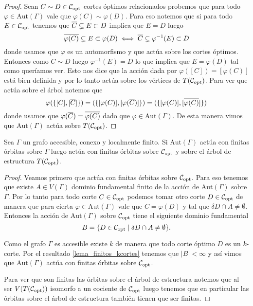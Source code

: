 \documentclass[tesis.tex]{subfiles}
\newcommand{\aut}{\text{Aut}}
\begin{document}
\begin{proof}
	Sean $C \sim D \in {\cal C}_{\text{opt}}$ cortes óptimos relacionados probemos que para todo $\varphi \in \aut(\Gamma)$ vale que $\varphi(C) \sim \varphi(D)$.
	Para eso notemos que si para todo $E \in {\cal C}_{\text{opt}}$ tenemos que 
	$\overline C \subsetneq E \subset D$ implica que $E = D$ luego
	\[
	\overline {\varphi(C)} \subsetneq E \subset \varphi(D) \iff \overline C \subsetneq \varphi^{-1}(E) \subset D
	\]  
	donde usamos que $\varphi$ es un automorfismo y que actúa sobre los cortes óptimos.
	Entonces como $C \sim D$ luego $\varphi^{-1}(E) = D$ lo que implica que $E = \varphi(D)$ tal como queríamos ver.
	Esto nos dice que la acción dada por $\varphi([C]) = [\varphi (C)]$ está bien definida y por lo tanto actúa sobre los vértices de $T({\cal C}_{\text{opt}})$.
	Para ver que actúa sobre el árbol notemos que 
	\[
		\varphi(\{[C],[\overline C]\}) = (\{[\varphi (C)], [\varphi (\overline C)]\}) = (\{[\varphi (C)], [\overline{\varphi (C)}]\})
	\]
	donde usamos que $\varphi(\overline{C}) = \overline{\varphi(C)}$ dado que $\varphi \in \aut(\Gamma)$.
	De esta manera vimos que $\aut(\Gamma)$ actúa sobre $T({\cal C}_{\text{opt}})$.
\end{proof}


\begin{lema}\label{lema_finitas_orbitas}
	Sea $\Gamma$ un grafo accesible, conexo y localmente finito.
	Si $\aut(\Gamma)$ actúa con finitas órbitas sobre $\Gamma$ luego actúa con finitas órbitas sobre ${\cal C}_{\text{opt}}$ y sobre el árbol de estructura $T({\cal C}_{\text{opt}})$.
\end{lema} 
\begin{proof}
	Veamos primero que actúa con finitas órbitas sobre ${\cal C}_{\text{opt}}$.
	Para eso tenemos que existe $A \in V(\Gamma)$ dominio fundamental finito de la acción de $\aut(\Gamma)$ sobre $\Gamma$.
	Por lo tanto para todo corte $C \in {\cal C}_{\text{opt}}$ podemos tomar otro corte $D \in {\cal C}_{\text{opt}}$ de manera que para cierta $\varphi \in \aut(\Gamma)$ vale que $C  = \varphi(D)$ y tal que $\delta D \cap A \neq \emptyset$.
	Entonces la acción de $\aut(\Gamma)$ sobre ${\cal C}_{\text{opt}}$ tiene el siguiente dominio fundamental
	\[
		B = \{  D \in {\cal C}_{\text{opt}} \mid \delta D \cap A \neq \emptyset \}.
	\]
	
	Como el grafo $\Gamma$ es accesible existe $k$ de manera que todo corte óptimo $D$ es un $k$-corte.
	Por el resultado \ref{lema_finitos_kcortes} tenemos que $|B| < \infty$ y así vimos que $\aut(\Gamma)$ actúa con finitas órbitas sobre ${\cal C}_{\text{opt}}$. 
	
	Para ver que son finitas las órbitas sobre el árbol de estructura notemos que al ser $V(T({\cal C}_{\text{opt}}))$ isomorfo a un cociente de ${\cal C}_{\text{opt}}$ luego tenemos que en particular las órbitas sobre el árbol de estructura también tienen que ser finitas.
	
\end{proof}
\end{document}
